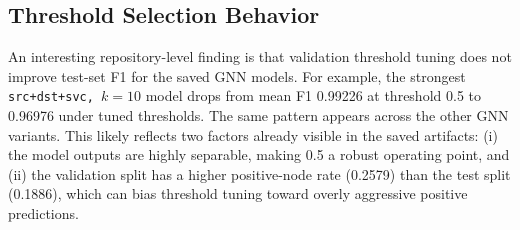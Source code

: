 \documentclass[conference]{IEEEtran}
\begin{document}
\begin{table}[t]
\caption{Repository aggregate results at threshold 0.5. Means and standard deviations are taken directly from the saved run artifacts; the MLP baseline has only one checked-in run.}
\label{tab:results}
\centering
{}
\end{table}

\subsection{Threshold Selection Behavior}
An interesting repository-level finding is that validation threshold tuning does not improve test-set F1 for the saved GNN models. For example, the strongest \texttt{src+dst+svc, $k=10$} model drops from mean F1 0.99226 at threshold 0.5 to 0.96976 under tuned thresholds. The same pattern appears across the other GNN variants. This likely reflects two factors already visible in the saved artifacts: (i) the model outputs are highly separable, making 0.5 a robust operating point, and (ii) the validation split has a higher positive-node rate (0.2579) than the test split (0.1886), which can bias threshold tuning toward overly aggressive positive predictions.
\end{document}
